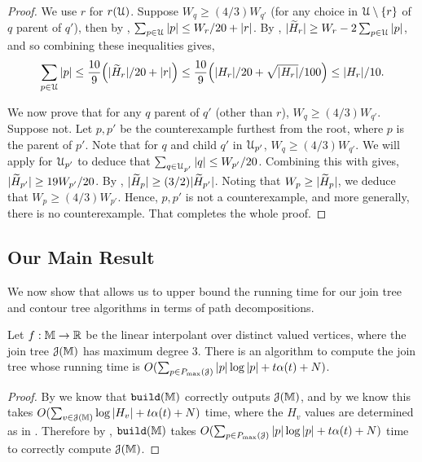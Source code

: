 {\begin{proof} We use $r$ for $r({\cal U})$. %
Suppose $W_q \geq (4/3)W_{q'}$ (for any choice in ${\cal U}\setminus\{r\}$ of $q$ parent of $q'$), 
then by , $\sum_{p \in {\cal U}} |p| \leq W_{r}/20+|r|$.
By , $|\widetilde{H}_r| \geq W_r - 2\sum_{p \in {\cal U}} |p|$, and so combining these inequalities gives,
\[
 \sum_{p \in {\cal U}} |p|\leq \frac{10}{9} \!\left({|\widetilde{H}_r|/20+|r|}\right) \leq 
 \frac{10}{9}\!\left({|H_r|/20+\sqrt{|H_r|}/100}\right) \leq |H_r|/10.
\]

We now prove that for any $q$ parent of $q'$ (other than $r$), $W_q \geq (4/3)W_{q'}$.
Suppose not. Let $p, p'$ be the counterexample furthest from the root,
where $p$ is the parent of $p'$. 
Note that for $q$ and child $q'$ in ${\cal U}_{p'}$, $W_q \geq (4/3)W_{q'}$.
We will apply  for ${\cal U}_{p'}$ to deduce that $\sum_{q \in {\cal U}_{p'}} |q| \leq W_{p'}/20$.
Combining this with  gives, $|\widetilde{H}_{p'}| \geq 19W_{p'}/20$. By , $|\widetilde{H}_p| \geq (3/2)|\widetilde{H}_{p'}|$.
Noting that $W_p \geq |\widetilde{H}_p|$, we deduce that $W_p \geq (4/3)W_{p'}$.
Hence, $p, p'$ is not a counterexample, and more generally, there is no counterexample.
That completes the whole proof.
\end{proof}

\subsection{Our Main Result}
\label{sec:implications}

We now show that  allows us to upper bound the running time for our join tree and contour 
tree algorithms in terms of path decompositions.

\begin{theorem}
Let $f:\mathbb{M} \to \mathbb{R}$ be the linear interpolant over distinct valued vertices, where the join tree ${\cal J}(\mathbb{M})$ has maximum degree $3$.
There is an algorithm to compute the join tree whose running time is $O(\sum_{p \in P_{\max}({\cal J})} |p|\log |p| + t\alpha(t) + N)$.
\end{theorem}
\begin{proof}
By  we know that ${\tt build}(\mathbb{M})$ correctly outputs ${\cal J}(\mathbb{M})$, and by 
we know this takes $O(\sum_{v \in {\cal J}(\mathbb{M})} \log |H_v| + t\alpha(t) + N)$ time, where the $H_v$ values are determined as in .
Therefore by , ${\tt build}(\mathbb{M})$ takes $O(\sum_{p \in P_{\max}({\cal J})} |p|\log |p| + t\alpha(t) + N)$ 
time to correctly compute ${\cal J}(\mathbb{M})$.
\end{proof}

}
